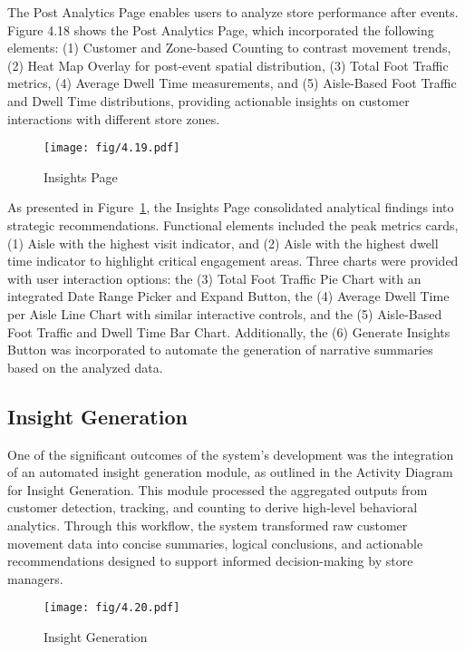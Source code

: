 {The Post Analytics Page enables users to analyze store performance after events. Figure 4.18 shows the Post Analytics Page, which incorporated the following elements: (1) Customer and Zone-based Counting to contrast movement trends, (2) Heat Map Overlay for post-event spatial distribution, (3) Total Foot Traffic metrics, (4) Average Dwell Time measurements, and (5) Aisle-Based Foot Traffic and Dwell Time distributions, providing actionable insights on customer interactions with different store zones.

\begin{figure}[H]
	\caption[Insights Page]{\newline \newline Insights Page}
	\centering
	\texttt{[image: fig/4.19.pdf]}
	\label{fig:4.19}
\end{figure}

As presented in Figure~\ref{fig:4.19}, the Insights Page consolidated analytical findings into strategic recommendations. Functional elements included the peak metrics cards, (1) Aisle with the highest visit indicator, and (2) Aisle with the highest dwell time indicator to highlight critical engagement areas. Three charts were provided with user interaction options: the (3) Total Foot Traffic Pie Chart with an integrated Date Range Picker and Expand Button, the (4) Average Dwell Time per Aisle Line Chart with similar interactive controls, and the (5) Aisle-Based Foot Traffic and Dwell Time Bar Chart. Additionally, the (6) Generate Insights Button was incorporated to automate the generation of narrative summaries based on the analyzed data.

\subsection{Insight Generation}
One of the significant outcomes of the system's development was the integration of an automated insight generation module, as outlined in the Activity Diagram for Insight Generation. This module processed the aggregated outputs from customer detection, tracking, and counting to derive high-level behavioral analytics. Through this workflow, the system transformed raw customer movement data into concise summaries, logical conclusions, and actionable recommendations designed to support informed decision-making by store managers.

\begin{figure}[H]
	\caption[Insight Generation]{\newline \newline Insight Generation}
	\centering
	\texttt{[image: fig/4.20.pdf]}
	\label{fig:4.20}
\end{figure}

}
